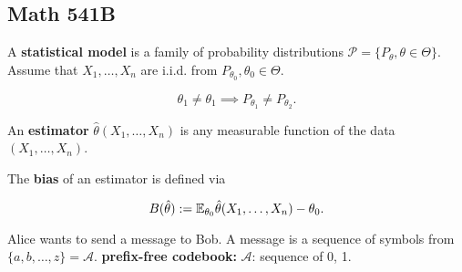 \subsection{Math 541B}

\begin{definition} A \textbf{statistical model} is a family of probability distributions \(\mathcal{P} = \{ P_{\theta}, \theta \in \Theta\}\). Assume that \(X_1, \ldots, X_n\) are i.i.d. from \(P_{\theta_0}, \theta_0 \in \Theta\).

\end{definition}

\begin{definition}

\[
\theta_1 \neq \theta_1 \implies P_{\theta_1} \neq P_{\theta_2}.
\]

\end{definition}

\begin{definition}

An \textbf{estimator} \(\hat{\theta}(X_1, \ldots, X_n)\) is any measurable function of the data \((X_1, \ldots, X_n)\).

\end{definition}

\begin{definition}

The \textbf{bias} of an estimator is defined via

\[
B(\hat{\theta}) := \E_{\theta_0} \hat{\theta}(X_1, \ldots, X_n) - \theta_0.
\]

\end{definition}

\begin{example}

Alice wants to send a message to Bob. A message is a sequence of symbols from \(\{a, b, \ldots, z\} = \mathcal{A}\). \textbf{prefix-free codebook:} \(\mathcal{A}\): sequence of 0, 1.

\end{example}

